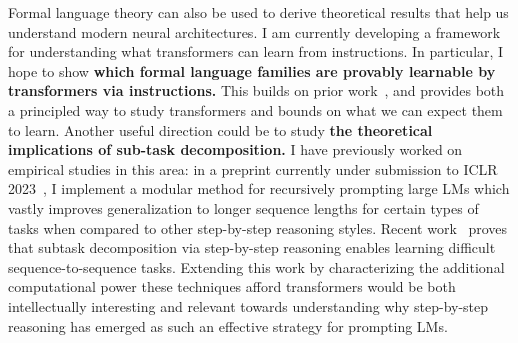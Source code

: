\documentclass[11pt]{article}
\begin{document}
Formal language theory can also be used to derive theoretical results 
that help us understand modern neural architectures. 
I am currently developing a framework for 
understanding what transformers can learn from instructions. 
In particular, I hope to show \textbf{which formal language families 
are provably learnable by transformers 
via instructions.}
This builds on prior work~\cite{Merrill2022LogPrecisionTA},
and provides both a principled way to study transformers 
and bounds on what we can expect them to learn.
Another useful direction could be to study
\textbf{the theoretical implications of sub-task decomposition.}
I have previously worked on empirical studies in this area:
in a preprint currently under submission 
to ICLR 2023~\cite{Khot2022DecomposedPA},
I implement a modular method for recursively prompting large LMs 
which vastly improves generalization to longer sequence lengths 
for certain types of tasks 
when compared to other step-by-step reasoning styles.
Recent work~\cite{Wies2022SubTaskDE} 
proves that subtask decomposition
via step-by-step reasoning
enables learning difficult sequence-to-sequence tasks.
Extending this work
by characterizing the additional computational power 
these techniques afford transformers
would be both intellectually interesting
and relevant towards understanding why step-by-step reasoning 
has emerged as such an effective strategy for prompting LMs.
\end{document}
